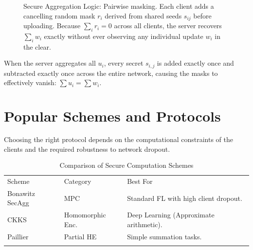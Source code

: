 \begin{figure}[t]
\caption{Secure Aggregation Logic: Pairwise masking. Each client adds a cancelling
         random mask $r_i$ derived from shared seeds $s_{ij}$ before uploading. Because
         $\sum_i r_i = 0$ across all clients, the server recovers $\sum_i w_i$ exactly
         without ever observing any individual update $w_i$ in the clear.}
\label{fig:ch8_secagg}
\end{figure}

When the server aggregates all $u_i$, every secret $s_{i,j}$ is added exactly once and subtracted exactly once across the entire network, causing the masks to effectively vanish: $\sum u_i = \sum w_i$.

\section{Popular Schemes and Protocols}
\label{sec:secagg_protocols}

Choosing the right protocol depends on the computational constraints of the clients and the required robustness to network dropout.

\begin{table}
\caption{Comparison of Secure Computation Schemes}
\label{tab:secagg_schemes}
\begin{tabular}{p{3cm}p{3cm}p{4.5cm}}
\hline\noalign{\smallskip}
Scheme & Category & Best For \\
\noalign{\smallskip}\svhline\noalign{\smallskip}
Bonawitz SecAgg & MPC & Standard FL with high client dropout. \\
CKKS & Homomorphic Enc. & Deep Learning (Approximate arithmetic). \\
Paillier & Partial HE & Simple summation tasks. \\
\noalign{\smallskip}\hline\noalign{\smallskip}
\end{tabular}
\end{table}

